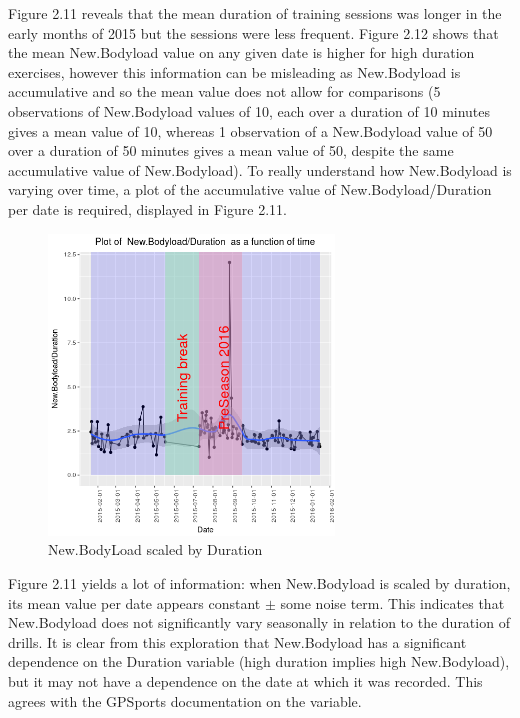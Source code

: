 Figure 2.11 reveals that the mean duration of training sessions was longer in the early months of 2015 but the sessions were less frequent. Figure 2.12 shows that the mean New.Bodyload value on any given date is higher for high duration exercises, however this information can be misleading as New.Bodyload is accumulative and so the mean value does not allow for comparisons (5 observations of New.Bodyload values of 10, each over a duration of 10 minutes gives a mean value of 10, whereas 1 observation of a New.Bodyload value of 50 over a duration of 50 minutes gives a mean value of 50, despite the same accumulative value of New.Bodyload). To really understand how New.Bodyload is varying over time, a plot of the accumulative value of New.Bodyload/Duration per date is required, displayed in Figure 2.11. 

\begin{figure}[h]
	\centering
	\includegraphics[width=0.6\linewidth, height=8cm]{Images/NBLScaledByDuration.png}
	\caption{New.BodyLoad scaled by Duration}
\end{figure}

Figure 2.11 yields a lot of information: when New.Bodyload is scaled by duration, its mean value per date appears constant $\pm$ some noise term. This indicates that New.Bodyload does not significantly vary seasonally in relation to the duration of drills. It is clear from this exploration that New.Bodyload has a significant dependence on the Duration variable (high duration implies high New.Bodyload), but it may not have a dependence on the date at which it was recorded. This agrees with the GPSports documentation on the variable.

